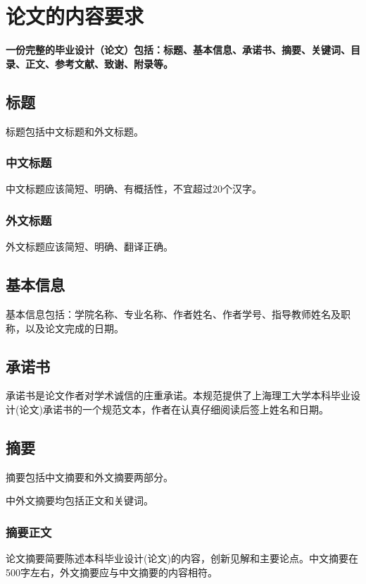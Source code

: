 \chapter{论文的内容要求}
\label{chap:contents}
\par {\bfseries 一份完整的毕业设计（论文）包括：标题、基本信息、承诺书、摘要、关键词、目录、正文、参考文献、致谢、附录等。}

\section{标题}
\par 标题包括中文标题和外文标题。

\subsection{中文标题}
\par 中文标题应该简短、明确、有概括性，不宜超过20个汉字。

\subsection{外文标题}
\par 外文标题应该简短、明确、翻译正确。

\section{基本信息}
\par 基本信息包括：学院名称、专业名称、作者姓名、作者学号、指导教师姓名及职称，以及论文完成的日期。

\section{承诺书}
\par 承诺书是论文作者对学术诚信的庄重承诺。本规范提供了上海理工大学本科毕业设计(论文)承诺书的一个规范文本，作者在认真仔细阅读后签上姓名和日期。

\section{摘要}
\par 摘要包括中文摘要和外文摘要两部分。
\par 中外文摘要均包括正文和关键词。

\subsection{摘要正文}
\par 论文摘要简要陈述本科毕业设计(论文)的内容，创新见解和主要论点。中文摘要在500字左右，外文摘要应与中文摘要的内容相符。

